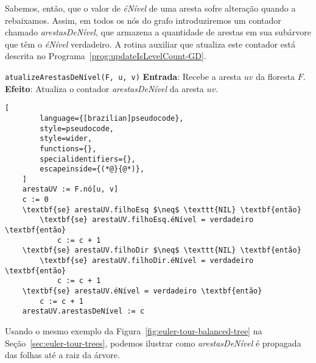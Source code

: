 Sabemos, então, que o valor de \textit{éNível} de uma aresta sofre alteração quando a rebaixamos. Assim, em todos os nós do grafo introduziremos um contador chamado \textit{arestasDeNível}, que armazena a quantidade de arestas em sua subárvore que têm o \textit{éNível} verdadeiro. A rotina auxiliar que atualiza este contador está descrita no Programa~\ref{prog:updateIsLevelCount-GD}.

\begin{programruledcaption}{\texttt{atualizeArestasDeNível(F, u, v)} \label{prog:updateIsLevelCount-GD}}
    \noindent\textbf{Entrada}: Recebe a aresta $uv$ da floresta $F$.\\
    \noindent\textbf{Efeito}: Atualiza o contador \textit{arestasDeNível} da aresta $uv$.
    \vspace{-0.5\baselineskip}
    \begin{lstlisting}[
        language={[brazilian]pseudocode},
        style=pseudocode,
        style=wider,
        functions={},
        specialidentifiers={},
        escapeinside={(*@}{@*)},
    ]
    arestaUV := F.nó[u, v]
    c := 0
    \textbf{se} arestaUV.filhoEsq $\neq$ \texttt{NIL} \textbf{então}
        \textbf{se} arestaUV.filhoEsq.éNível = verdadeiro \textbf{então}
            c := c + 1
    \textbf{se} arestaUV.filhoDir $\neq$ \texttt{NIL} \textbf{então}
        \textbf{se} arestaUV.filhoDir.éNível = verdadeiro \textbf{então}
            c := c + 1
    \textbf{se} arestaUV.éNível = verdadeiro \textbf{então}
        c := c + 1
    arestaUV.arestasDeNível := c
\end{lstlisting}
\vspace{-0.5\baselineskip}
\end{programruledcaption}

Usando o mesmo exemplo da Figura~\ref{fig:euler-tour-balanced-tree} na Seção~\ref{sec:euler-tour-trees}, podemos ilustrar como \textit{arestasDeNível} é propagada das folhas até a raiz da árvore.

